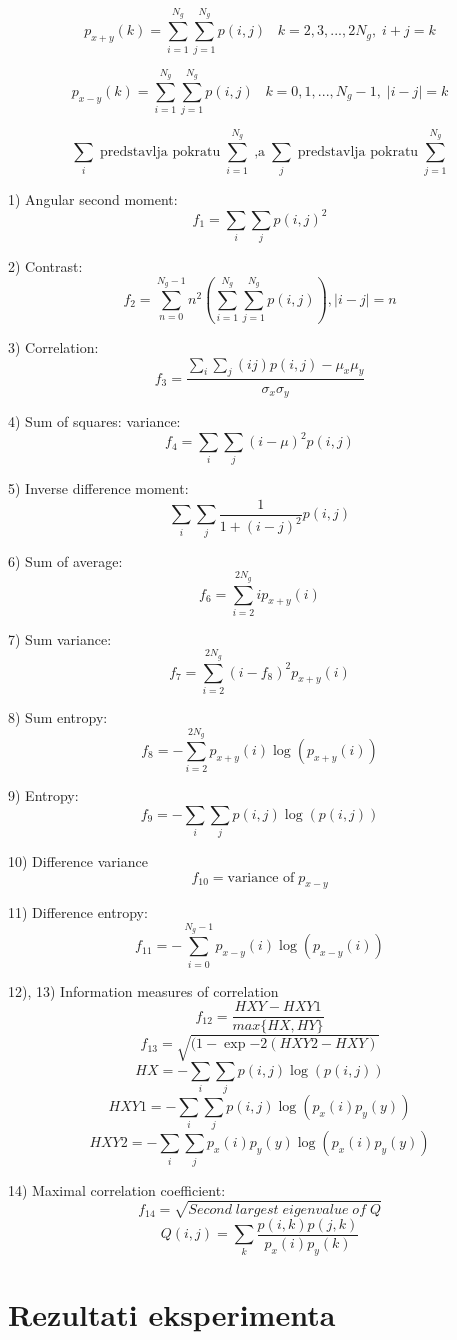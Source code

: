 \documentclass[times, utf8, zavrsni]{fer}
\begin{document}
\[
p_{x+y}(k)=\sum_{i=1}^{N_g} \sum_{j=1}^{N_g} p(i,j) \;\;\; k=2,3,...,2N_g, \; i+j=k
\]

\[
p_{x-y}(k)=\sum_{i=1}^{N_g} \sum_{j=1}^{N_g} p(i,j) \;\;\; k=0,1,...,N_g-1, \; \left|i-j\right|=k
\]

\[
\sum_i \; \textrm{predstavlja pokratu} \; \sum_{i=1}^{N_g} \; \textrm{,a} \;
\sum_{j} \; \textrm{predstavlja pokratu} \; \sum_{j=1}^{N_g}
\]

\newpage

1) Angular second moment:
\[
f_1 = \sum_{i}\sum_{j}p(i,j)^2
\]

2) Contrast:
\[
f_2 = \sum_{n=0}^{N_g-1}n^2 \left( \sum_{i=1}^{N_g}\sum_{j=1}^{N_g}p(i,j) \right), \left| i-j \right| = n
\]

3) Correlation:
\[
f_3 = \frac{\sum_i\sum_j\left(ij\right)p(i,j) - \mu_x\mu_y}{\sigma_x\sigma_y}
\]

4) Sum of squares: variance:
\[
f_4 = \sum_i\sum_j(i-\mu)^2p(i,j)
\]

5) Inverse difference moment:
\[
\sum_i\sum_j \frac{1}{1+(i-j)^2}p(i,j)
\]

6) Sum of average:
\[
f_6 = \sum_{i=2}^{2N_g}ip_{x+y}(i)
\]

7) Sum variance:
\[
f_7 = \sum_{i=2}^{2N_g}(i-f_8)^2p_{x+y}(i)
\]

8) Sum entropy:
\[
f_8 = -\sum_{i=2}^{2N_g}p_{x+y}(i)\log(p_{x+y}(i))
\]

9) Entropy:
\[
f_9 = -\sum_i\sum_j p(i,j)\log(p(i,j))
\]

10) Difference variance
\[
f_{10} = \textrm{variance of} \; p_{x-y}
\]

11) Difference entropy:
\[
f_{11} = -\sum_{i=0}^{N_g-1}p_{x-y}(i)\log(p_{x-y}(i)) 
\]

12), 13) Information measures of correlation
\[
f_{12} = \frac{HXY - HXY1}{max\{HX,HY\}}
\]
\[
f_{13} = \sqrt{(1-\exp{-2(HXY2 - HXY)}}
\]
\[
HX = -\sum_i\sum_j p(i,j)\log(p(i,j))
\]
\[
HXY1 = -\sum_i\sum_j p(i,j)\log(p_x(i)p_y(y))
\]
\[
HXY2 = -\sum_i\sum_j p_x(i)p_y(y) \log(p_x(i)p_y(y))
\]

14) Maximal correlation coefficient:
\[
f_{14} = \sqrt{Second \; largest \; eigenvalue \; of \; Q}
\]
\[
Q(i,j) = \sum_k \frac{p(i,k)p(j,k)}{p_x(i)p_y(k)}
\]

\chapter{Rezultati eksperimenta}
\end{document}
